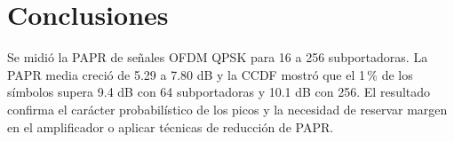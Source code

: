 \documentclass[11pt,a4paper]{article}
\begin{document}
\section{Conclusiones}

Se midió la PAPR de señales OFDM QPSK para 16 a 256 subportadoras. La PAPR media creció de
5.29 a 7.80 dB y la CCDF mostró que el 1\,\% de los símbolos supera 9.4 dB con 64
subportadoras y 10.1 dB con 256. El resultado confirma el carácter probabilístico de los
picos y la necesidad de reservar margen en el amplificador o aplicar técnicas de reducción
de PAPR.
\end{document}
